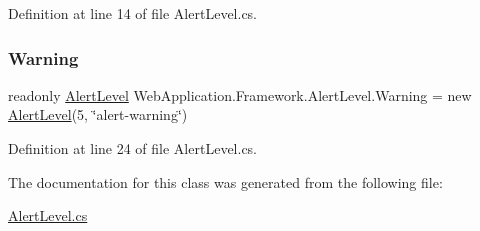 Definition at line 14 of file Alert\+Level.\+cs.

\mbox{\label{classWebApplication_1_1Framework_1_1AlertLevel_a446058e14c2e46ed2ed3232cb6c6b155}} 
\subsubsection{\texorpdfstring{Warning}{Warning}}
{\footnotesize\ttfamily readonly \mbox{\hyperlink{classWebApplication_1_1Framework_1_1AlertLevel}{Alert\+Level}} Web\+Application.\+Framework.\+Alert\+Level.\+Warning = new \mbox{\hyperlink{classWebApplication_1_1Framework_1_1AlertLevel}{Alert\+Level}}(5, \char`\"{}alert-\/warning\char`\"{})\hspace{0.3cm}{\ttfamily [static]}}



Definition at line 24 of file Alert\+Level.\+cs.



The documentation for this class was generated from the following file\+:\begin{DoxyCompactItemize}
\item 
\mbox{\hyperlink{AlertLevel_8cs}{Alert\+Level.\+cs}}\end{DoxyCompactItemize}
